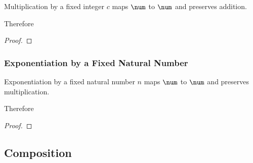 \documentclass{amsart}
\begin{document}
\begin{example}
Multiplication by a fixed integer $c$ maps $\num$ to $\num$ and preserves addition.


Therefore

\begin{proof}
\end{proof}

\end{example}

\subsubsection{Exponentiation by a Fixed Natural Number}

\begin{example}
Exponentiation by a fixed natural number $n$ maps $\num$ to $\num$ and preserves multiplication.


Therefore

\begin{proof}
\end{proof}

\end{example}

\subsection{Composition}
\end{document}
